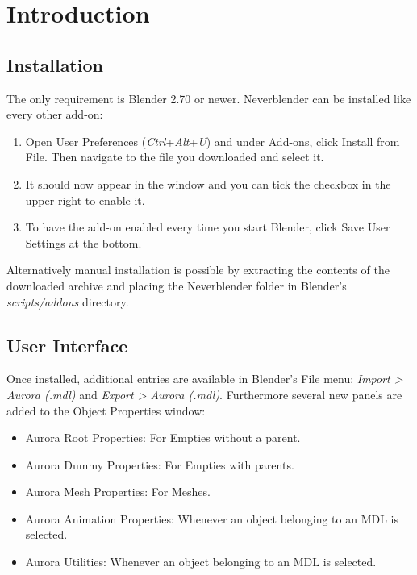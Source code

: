 \chapter{Introduction}

\section{Installation}
The only requirement is Blender 2.70 or newer. Neverblender can be installed
like every other add-on: 
\begin{enumerate}
\item Open User Preferences (\textit{Ctrl}+\textit{Alt}+\textit{U}) and under Add-ons, 
click Install from File. Then navigate to the file you downloaded and select it.
\item It should now appear in the window and you can tick the checkbox in the upper right to enable it.
\item To have the add-on enabled every time you start Blender, click Save User Settings at the bottom.
\end{enumerate}

Alternatively manual installation is possible by extracting the contents of the
downloaded archive and placing the Neverblender folder in Blender's \textit{scripts/addons} directory.\\

\section{User Interface}
Once installed, additional entries are available in Blender's File menu: \textit{Import > Aurora (.mdl)} and 
\textit{Export > Aurora (.mdl)}. Furthermore several new panels are added to the Object Properties window:
\begin{itemize}
\item Aurora Root Properties: For Empties without a parent.
\item Aurora Dummy Properties: For Empties with parents.
\item Aurora Mesh Properties: For Meshes.
\item Aurora Animation Properties: Whenever an object belonging to an MDL is selected.
\item Aurora Utilities: Whenever an object belonging to an MDL is selected.
\end{itemize}